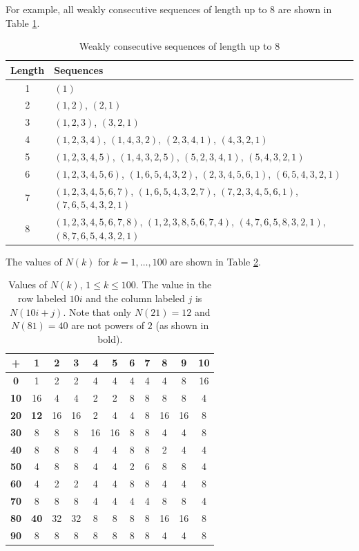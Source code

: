 \documentclass{article}
\theoremstyle{definition}
\theoremstyle{remark}
\numberwithin{equation}{section}
\numberwithin{case}{theorem}
\begin{document}
For example, all weakly consecutive sequences of length up to $8$ are shown in Table \ref{tab:WCS}.
\begin{table}[htbp]
    \centering
    \begin{tabular}{c|l}
    Length & Sequences \\ 
    \hline
    1 & $(1)$ \\
    2 & $(1,2)$, $(2,1)$ \\
    3 & $(1,2,3)$, $(3,2,1)$ \\
    4 & $(1,2,3,4)$, $(1,4,3,2)$, $(2,3,4,1)$, $(4,3,2,1)$ \\
    5 & $(1,2,3,4,5)$, $(1,4,3,2,5)$, $(5,2,3,4,1)$, $(5,4,3,2,1)$ \\
    6 & $(1,2,3,4,5,6)$, $(1,6,5,4,3,2)$, $(2,3,4,5,6,1)$, $(6,5,4,3,2,1)$ \\
    7 & $(1,2,3,4,5,6,7)$, $(1,6,5,4,3,2,7)$, $(7,2,3,4,5,6,1)$, $(7,6,5,4,3,2,1)$ \\
    8 & $(1,2,3,4,5,6,7,8)$, $(1,2,3,8,5,6,7,4)$, $(4,7,6,5,8,3,2,1)$, $(8,7,6,5,4,3,2,1)$
\end{tabular}
    \caption{Weakly consecutive sequences of length up to $8$}
    \label{tab:WCS}
\end{table}


The values of $N(k)$ for $k=1, \dots, 100$ are shown in Table \ref{tab:N(k)}.
\begin{table}
    \centering
    \begin{tabular}{>{\bfseries}c||c|c|c|c|c|c|c|c|c|c}
        + & \bfseries{ 1 } & \bfseries{ 2 } & \bfseries{ 3 } & \bfseries{ 4 } & \bfseries{ 5 } & \bfseries{ 6 } & \bfseries{ 7 } & \bfseries{ 8 } & \bfseries{ 9 } & \bfseries{ 10 } \\
        \hline
        \hline
        0 & 1 & 2 & 2 & 4 & 4 & 4 & 4 & 4 & 8 & 16 \\ 
        \hline
        10 & 16 & 4 & 4 & 2 & 2 & 8 & 8 & 8 & 8 & 4 \\ 
        \hline
        20 & \textbf{12} & 16 & 16 & 2 & 4 & 4 & 8 & 16 & 16 & 8 \\ 
        \hline
        30 & 8 & 8 & 8 & 16 & 16 & 8 & 8 & 4 & 4 & 8 \\ 
        \hline
        40 & 8 & 8 & 8 & 4 & 4 & 8 & 8 & 2 & 4 & 4 \\ 
        \hline
        50 & 4 & 8 & 8 & 4 & 4 & 2 & 6 & 8 & 8 & 4 \\ 
        \hline
        60 & 4 & 2 & 2 & 4 & 4 & 8 & 8 & 4 & 4 & 8 \\ 
        \hline
        70 & 8 & 8 & 8 & 4 & 4 & 4 & 4 & 8 & 8 & 4 \\ 
        \hline
        80 & \textbf{40} & 32 & 32 & 8 & 8 & 8 & 8 & 16 & 16 & 8 \\ 
        \hline
        90 & 8 & 8 & 8 & 8 & 8 & 8 & 8 & 4 & 4 & 8
    \end{tabular}
    \caption{Values of $N(k)$, $1 \leq k \leq 100$. The value in the row labeled $10 i$ and the column labeled $j$ is $N(10 i + j)$. Note that only $N(21) = 12$ and $N(81) = 40$ are not powers of $2$ (as shown in bold).}
    \label{tab:N(k)}
\end{table}
\end{document}
